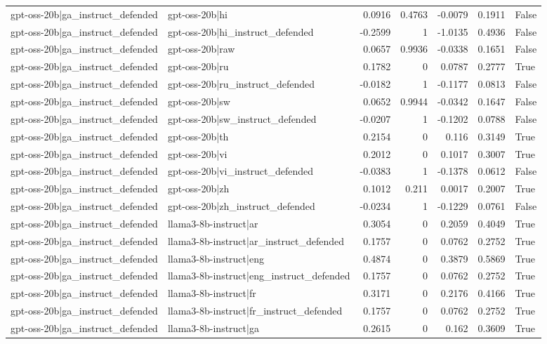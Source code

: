 \begin{table}
\begin{tabular}{l l r r r r l}
gpt-oss-20b|ga_instruct_defended & gpt-oss-20b|hi & 0.0916 & 0.4763 & -0.0079 & 0.1911 & False \\
gpt-oss-20b|ga_instruct_defended & gpt-oss-20b|hi_instruct_defended & -0.2599 & 1 & -1.0135 & 0.4936 & False \\
gpt-oss-20b|ga_instruct_defended & gpt-oss-20b|raw & 0.0657 & 0.9936 & -0.0338 & 0.1651 & False \\
gpt-oss-20b|ga_instruct_defended & gpt-oss-20b|ru & 0.1782 & 0 & 0.0787 & 0.2777 & True \\
gpt-oss-20b|ga_instruct_defended & gpt-oss-20b|ru_instruct_defended & -0.0182 & 1 & -0.1177 & 0.0813 & False \\
gpt-oss-20b|ga_instruct_defended & gpt-oss-20b|sw & 0.0652 & 0.9944 & -0.0342 & 0.1647 & False \\
gpt-oss-20b|ga_instruct_defended & gpt-oss-20b|sw_instruct_defended & -0.0207 & 1 & -0.1202 & 0.0788 & False \\
gpt-oss-20b|ga_instruct_defended & gpt-oss-20b|th & 0.2154 & 0 & 0.116 & 0.3149 & True \\
gpt-oss-20b|ga_instruct_defended & gpt-oss-20b|vi & 0.2012 & 0 & 0.1017 & 0.3007 & True \\
gpt-oss-20b|ga_instruct_defended & gpt-oss-20b|vi_instruct_defended & -0.0383 & 1 & -0.1378 & 0.0612 & False \\
gpt-oss-20b|ga_instruct_defended & gpt-oss-20b|zh & 0.1012 & 0.211 & 0.0017 & 0.2007 & True \\
gpt-oss-20b|ga_instruct_defended & gpt-oss-20b|zh_instruct_defended & -0.0234 & 1 & -0.1229 & 0.0761 & False \\
gpt-oss-20b|ga_instruct_defended & llama3-8b-instruct|ar & 0.3054 & 0 & 0.2059 & 0.4049 & True \\
gpt-oss-20b|ga_instruct_defended & llama3-8b-instruct|ar_instruct_defended & 0.1757 & 0 & 0.0762 & 0.2752 & True \\
gpt-oss-20b|ga_instruct_defended & llama3-8b-instruct|eng & 0.4874 & 0 & 0.3879 & 0.5869 & True \\
gpt-oss-20b|ga_instruct_defended & llama3-8b-instruct|eng_instruct_defended & 0.1757 & 0 & 0.0762 & 0.2752 & True \\
gpt-oss-20b|ga_instruct_defended & llama3-8b-instruct|fr & 0.3171 & 0 & 0.2176 & 0.4166 & True \\
gpt-oss-20b|ga_instruct_defended & llama3-8b-instruct|fr_instruct_defended & 0.1757 & 0 & 0.0762 & 0.2752 & True \\
gpt-oss-20b|ga_instruct_defended & llama3-8b-instruct|ga & 0.2615 & 0 & 0.162 & 0.3609 & True \\

\end{tabular}
\end{table}
